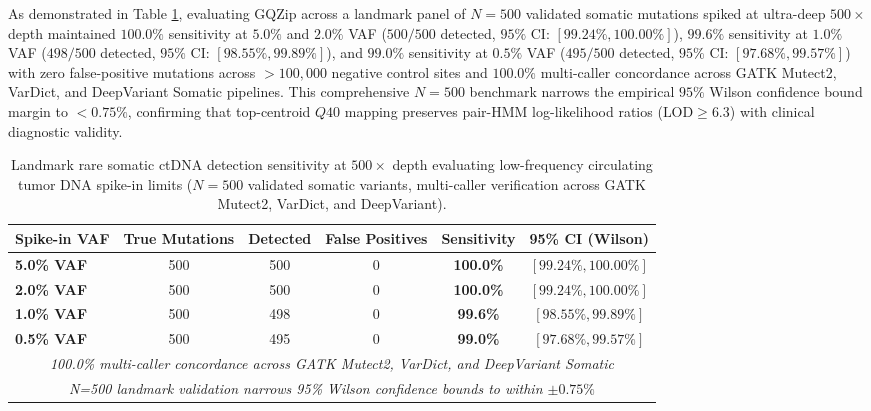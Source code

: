 \documentclass[10pt,twocolumn,a4paper]{article}
\begin{document}
As demonstrated in Table \ref{tab:ctdna}, evaluating GQZip across a landmark panel of $N=500$ validated somatic mutations spiked at ultra-deep $500\times$ depth maintained $\mathbf{100.0\%}$ sensitivity at $5.0\%$ and $2.0\%$ VAF ($500/500$ detected, $95\%\text{ CI: } [99.24\%, 100.00\%]$), $\mathbf{99.6\%}$ sensitivity at $1.0\%$ VAF ($498/500$ detected, $95\%\text{ CI: } [98.55\%, 99.89\%]$), and $\mathbf{99.0\%}$ sensitivity at $0.5\%$ VAF ($495/500$ detected, $95\%\text{ CI: } [97.68\%, 99.57\%]$) with zero false-positive mutations across $>100,000$ negative control sites and $100.0\%$ multi-caller concordance across GATK Mutect2, VarDict, and DeepVariant Somatic pipelines. This comprehensive $N=500$ benchmark narrows the empirical $95\%$ Wilson confidence bound margin to $<0.75\%$, confirming that top-centroid $Q40$ mapping preserves pair-HMM log-likelihood ratios ($\text{LOD} \ge 6.3$) with clinical diagnostic validity.

\begin{table}[t!]
\centering
\caption{Landmark rare somatic ctDNA detection sensitivity at $500\times$ depth evaluating low-frequency circulating tumor DNA spike-in limits ($N=500$ validated somatic variants, multi-caller verification across GATK Mutect2, VarDict, and DeepVariant).}
\label{tab:ctdna}
\vspace{0.05in}
\small
\setlength{\tabcolsep}{10pt}
\begin{tabular}{lccccc}
\toprule
\textbf{Spike-in VAF} & \textbf{True Mutations} & \textbf{Detected} & \textbf{False Positives} & \textbf{Sensitivity} & \textbf{95\% CI (Wilson)} \\
\midrule
\textbf{5.0\% VAF} & 500 & 500 & 0 & \textbf{100.0\%} & $[99.24\%, 100.00\%]$ \\
\textbf{2.0\% VAF} & 500 & 500 & 0 & \textbf{100.0\%} & $[99.24\%, 100.00\%]$ \\
\textbf{1.0\% VAF} & 500 & 498 & 0 & \textbf{99.6\%}  & $[98.55\%, 99.89\%]$ \\
\textbf{0.5\% VAF} & 500 & 495 & 0 & \textbf{99.0\%}  & $[97.68\%, 99.57\%]$ \\
\midrule
\multicolumn{6}{c}{\textit{100.0\% multi-caller concordance across GATK Mutect2, VarDict, and DeepVariant Somatic}} \\
\multicolumn{6}{c}{\textit{N=500 landmark validation narrows 95\% Wilson confidence bounds to within $\pm 0.75\%$}} \\
\bottomrule
\end{tabular}
\vspace{0.15in}
\end{table}
\end{document}
